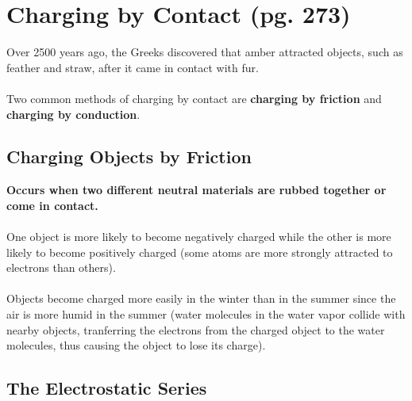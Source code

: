 \documentclass{article}
\begin{document}

\newpage

\section{Charging by Contact (pg. 273)}

    Over 2500 years ago, the Greeks discovered that amber attracted objects, such as feather and straw, after it came in contact with fur.\\\\
    Two common methods of charging by contact are \textbf{charging by friction} and \textbf{charging by conduction}.\\

    \subsection*{Charging Objects by Friction}

    \textbf{Occurs when two different neutral materials are rubbed together or come in contact.}\\\\
    One object is more likely to become negatively charged while the other is more likely to become positively charged (some atoms are more strongly attracted to electrons than others).\\\\
    Objects become charged more easily in the winter than in the summer since the air is more humid in the summer (water molecules in the water vapor collide with nearby objects, tranferring the electrons from the charged object to the water molecules, thus causing the object to lose its charge). \\

    \subsection*{The Electrostatic Series}
\end{document}
